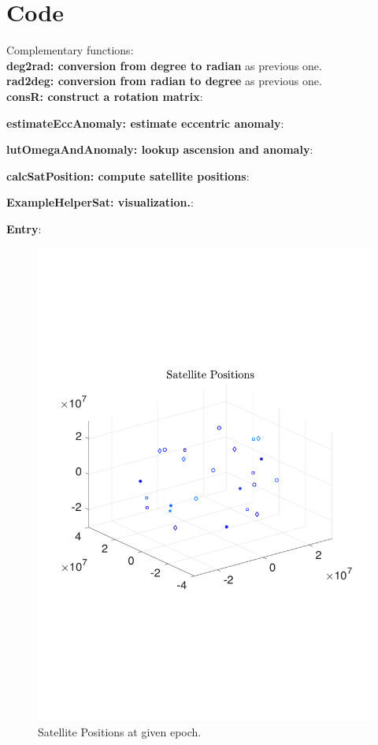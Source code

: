 \section{Code}
Complementary functions: \\
\textbf{deg2rad: conversion from degree to radian} as previous one. \\
\textbf{rad2deg: conversion from radian to degree} as previous one. \\
\textbf{consR: construct a rotation matrix}:

\textbf{estimateEccAnomaly: estimate eccentric anomaly}:

\textbf{lutOmegaAndAnomaly: lookup ascension and anomaly}:

\textbf{calcSatPosition: compute satellite positions}:

\textbf{ExampleHelperSat: visualization.}:

\textbf{Entry}:

\begin{figure}[h]
	\centering
	\includegraphics[width=\textwidth]{figures/ex21}
	\caption{Satellite Positions at given epoch.}
	\label{fig:ex2_1}
\end{figure}

